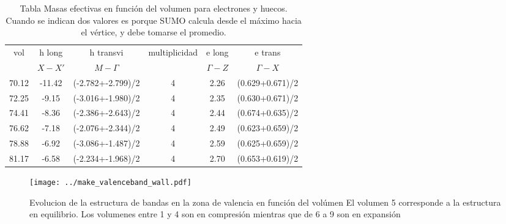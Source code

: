 \begin{table}
  \caption{
    \protect\label{TableEffMassVol} Tabla Masas efectivas en función del volumen para electrones 
    y huecos. Cuando se indican dos valores es porque SUMO calcula desde el máximo hacia 
    el vértice, y debe tomarse el promedio.
  }

    \small
  \begin{tabular*}{\textwidth}{|c|c|c|c|c|c|}
    \hline
vol   &h long         &h transvi       &multiplicidad&e long &e trans \\
       &$X - X'$&  $M - \Gamma$               &    &$\Gamma - Z$ &$\Gamma -  X$\\
     \hline
70.12  & -11.42       &(-2.782+-2.799)/2   &  4  &   2.26   &   (0.629+0.671)/2 \\
72.25  & -9.15        &(-3.016+-1.980)/2   &  4  &   2.35   &   (0.630+0.671)/2 \\ 
74.41  & -8.36        &(-2.386+-2.643)/2   &  4  &   2.44   &   (0.674+0.635)/2 \\ 
76.62  & -7.18        &(-2.076+-2.344)/2   &  4  &   2.49   &   (0.623+0.659)/2 \\
78.88  & -6.92        &(-3.086+-1.487)/2   &  4  &   2.59   &   (0.625+0.659)/2 \\
81.17  & -6.58        &(-2.234+-1.968)/2   &  4  &   2.70   &   (0.653+0.619)/2 \\
\hline
  \end{tabular*}
\end{table}

\begin{figure}

  \texttt{[image: ../make\_valenceband\_wall.pdf]}
  \caption{\label{FigureStructureBandWall} Evolucion de la estructura de bandas
  en la zona de valencia en función del volúmen El volumen 5 corresponde a 
  la estructura en equilibrio. Los volumenes entre 1 y 4 son en compresión 
  mientras que de 6 a 9 son en expansión}
\end{figure}



